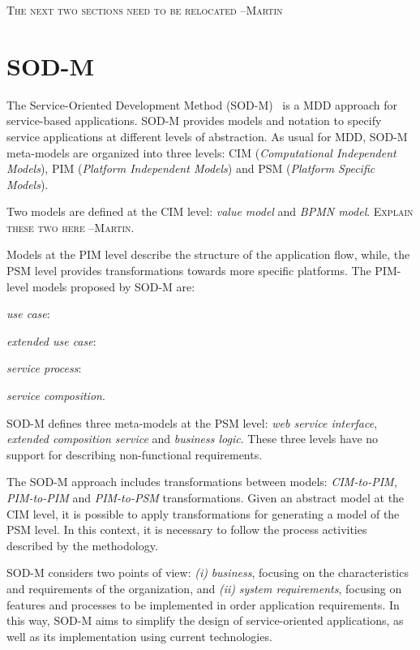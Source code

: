 \bigskip
\textsc{The next two sections need to be relocated --Martin}
\bigskip

\section{SOD-M}\label{sec:sodm}
The Service-Oriented Development Method (SOD-M)~\cite{decastro1} is a MDD approach for service-based applications.
SOD-M provides models and notation to specify service applications at different levels of abstraction. 
As usual for MDD, SOD-M meta-models are organized into three levels: CIM (\textit{Computational Independent Models}), PIM (\textit{Platform Independent Models}) and PSM (\textit{Platform Specific Models}).

Two models are defined at the CIM level: \textit{value model} 
and \textit{BPMN model}. 
\textsc{Explain these two here --Martin.}

Models at the PIM level describe the structure of the application flow,
while, the PSM level provides transformations towards more specific platforms.
The PIM-level models proposed by SOD-M are: 
\begin{trivlist}
\item \textit{use case}: 
\item \textit{extended use case}:
\item \textit{service process}:
\item \textit{service composition}. 
\end{trivlist}

SOD-M defines three meta-models at the PSM level: \textit{web service interface}, \textit{extended composition service} and \textit{business logic}. 
These three levels have no support for describing non-functional requirements. 

The SOD-M approach includes transformations between models:
\textit{CIM-to-PIM, PIM-to-PIM} and \textit{PIM-to-PSM} transformations. Given
an abstract model at the CIM level, it is possible to apply transformations for
generating a model of the PSM level. In this context, it is necessary to
follow the process activities described by the methodology. 

SOD-M considers two points of view:
\textit{(i)} \textit{business}, focusing on the characteristics and requirements
of the organization, and \textit{(ii)} \textit{system requirements}, focusing on
features and processes to be implemented in order application requirements. In
this way, SOD-M aims to simplify the design of service-oriented applications, as
well as its implementation using current technologies.


